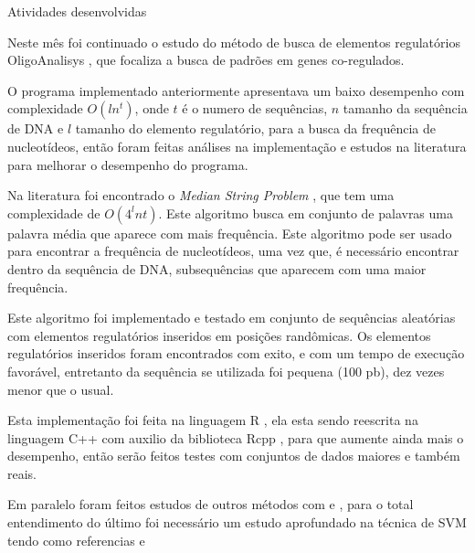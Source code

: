 \begin{LARGE}
Atividades desenvolvidas
\end{LARGE}  

Neste mês foi continuado o estudo do  método de busca de elementos regulatórios OligoAnalisys \cite{Helden1998}, que focaliza a busca de padrões em genes co-regulados.

O programa implementado anteriormente apresentava um baixo desempenho com complexidade $O(l n^t)$, onde $t$ é o numero de sequências, $n$ tamanho da sequência de DNA e $l$ tamanho do elemento regulatório, para a busca da frequência de nucleotídeos, então foram feitas análises na implementação e estudos na literatura para melhorar o desempenho do programa.

Na literatura foi encontrado o \textit{Median String Problem} \cite{Jones2004book}, que tem uma complexidade de $O(4^l n t)$. Este algoritmo busca em conjunto de palavras uma palavra média que aparece com mais frequência. Este algoritmo pode ser usado para encontrar a frequência de nucleotídeos, uma vez que, é necessário encontrar dentro da sequência de DNA, subsequências que aparecem com uma maior frequência.

Este algoritmo foi implementado e testado em conjunto de sequências aleatórias com elementos regulatórios inseridos em posições randômicas. Os elementos regulatórios inseridos foram encontrados com exito, e com um tempo de execução favorável, entretanto da sequência se utilizada foi pequena (100 pb), dez vezes menor que o usual.

Esta implementação foi feita na linguagem R \cite{R2011}, ela esta sendo reescrita na linguagem C++ com auxilio da biblioteca Rcpp \cite{Eddelbuettel2011}, para que aumente ainda mais o desempenho, então serão feitos testes com conjuntos de dados maiores e também reais.

Em paralelo foram feitos estudos de outros métodos com \cite{Chan2005} e \cite{Kon2007}, para o total entendimento do último foi necessário um estudo aprofundado na técnica de SVM tendo como referencias \cite{Burges1998Support} e \cite{Vapnik1995Support}